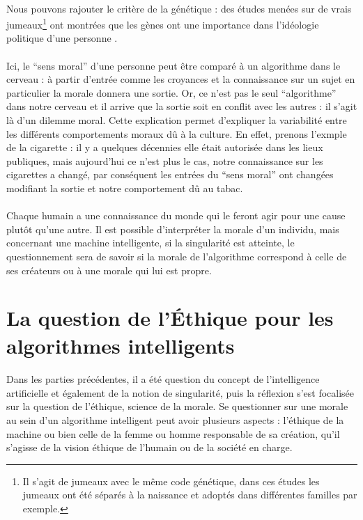 \documentclass[10pt, french, a4paper]{report}
\begin{document}
\paragraph{}
Nous pouvons rajouter le critère de la génétique : des études menées sur de vrais jumeaux\footnote{Il s'agit de jumeaux avec le même code génétique, dans ces études les jumeaux ont été séparés à la naissance et adoptés dans différentes familles par exemple.} ont montrées que les gènes ont une importance dans l'idéologie politique d'une personne \citep{bouchard_genetic_2003}.

\paragraph{}
Ici, le ``sens moral'' d'une personne peut être comparé à un algorithme dans le cerveau : à partir d'entrée comme les croyances et la connaissance sur un sujet en particulier la morale donnera une sortie. Or, ce n'est pas le seul ``algorithme'' dans notre cerveau et il arrive que la sortie soit en conflit avec les autres : il s'agit là d'un dilemme moral. Cette explication permet d'expliquer la variabilité entre les différents comportements moraux dû à la culture. En effet, prenons l'exmple de la cigarette : il y a quelques décennies elle était autorisée dans les lieux publiques, mais aujourd’hui ce n'est plus le cas, notre connaissance sur les cigarettes a changé, par conséquent les entrées du ``sens moral'' ont changées modifiant la sortie et notre comportement dû au tabac.

\paragraph{}
Chaque humain a une connaissance du monde qui le feront agir pour une cause plutôt qu’une autre. Il est possible d’interpréter la morale d'un individu, mais concernant une machine intelligente, si la singularité est atteinte, le questionnement sera de savoir si la morale de l'algorithme correspond à celle de ses créateurs ou à une morale qui lui est propre.


\section{La question de l'\uppercase{é}thique pour les algorithmes intelligents}
\label{sec:ia_ethique}

\paragraph{}
Dans les parties précédentes, il a été question du concept de l’intelligence artificielle et également de la notion de singularité, puis la réflexion s’est focalisée sur la question de l’éthique, science de la morale. Se questionner sur une morale au sein d’un algorithme intelligent peut avoir plusieurs aspects : l’éthique de la machine ou bien celle de la femme ou homme responsable de sa création, qu’il s’agisse de la vision éthique de l’humain ou de la société en charge.
\end{document}
